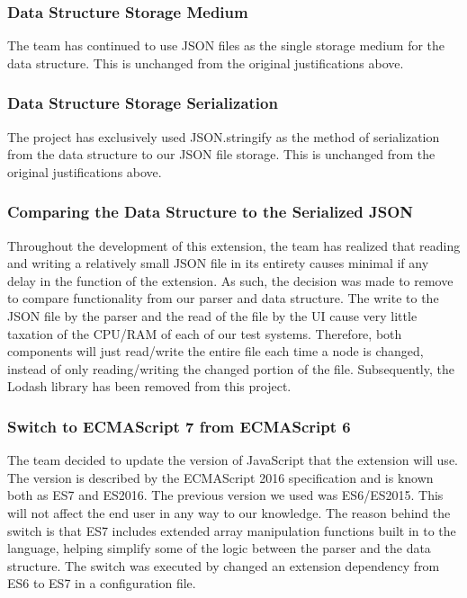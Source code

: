 \documentclass[letterpaper,10pt,titlepage,draftclsnofoot,onecolumn,onesided] {IEEEtran}
\begin{document}
\subsubsection{Data Structure Storage Medium}
The team has continued to use JSON files as the single storage medium for the data structure. 
This is unchanged from the original justifications above.

\subsubsection{Data Structure Storage Serialization}
The project has exclusively used JSON.stringify as the method of serialization from the data structure to our JSON file storage. 
This is unchanged from the original justifications above.

\subsubsection{Comparing the Data Structure to the Serialized JSON}
Throughout the development of this extension, the team has realized that reading and writing a relatively small JSON file in its entirety causes minimal if any delay in the function of the extension.
As such, the decision was made to remove to compare functionality from our parser and data structure. 
The write to the JSON file by the parser and the read of the file by the UI cause very little taxation of the CPU/RAM of each of our test systems.
Therefore, both components will just read/write the entire file each time a node is changed, instead of only reading/writing the changed portion of the file.
Subsequently, the Lodash library has been removed from this project.

\subsubsection{Switch to ECMAScript 7 from ECMAScript 6}
The team decided to update the version of JavaScript that the extension will use.
The version is described by the ECMAScript 2016 specification and is known both as ES7 and ES2016.
The previous version we used was ES6/ES2015.
This will not affect the end user in any way to our knowledge.
The reason behind the switch is that ES7 includes extended array manipulation functions built in to the language, helping simplify some of the logic between the parser and the data structure.
The switch was executed by changed an extension dependency from ES6 to ES7 in a configuration file. \cite{ES7}
\end{document}
